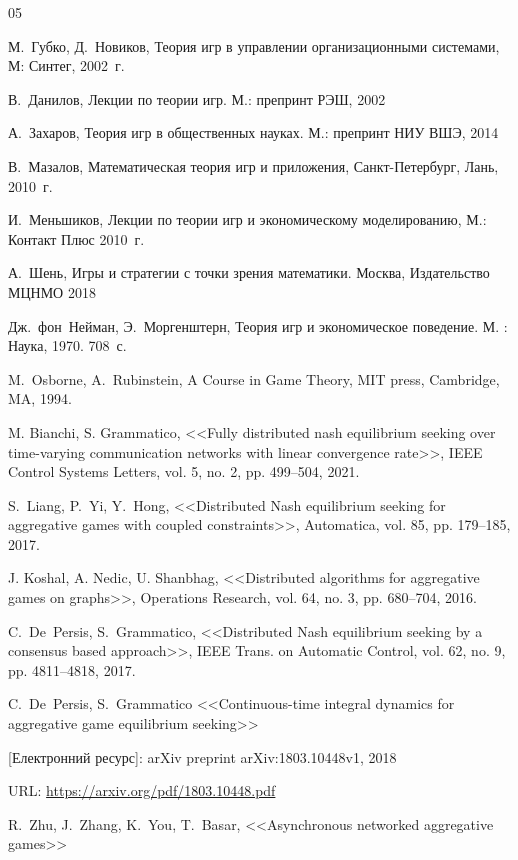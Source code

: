 \documentclass[a4paper]{article}
\begin{document}
\clearpage
\begin{thebibliography}{05}
{\small

 М.~Губко, Д.~Новиков, Теория игр в управлении организационными системами, М: Синтег, 2002~г.

 В.~Данилов, Лекции по теории игр. М.: препринт РЭШ, 2002

 А.~Захаров, Теория игр в общественных науках. М.: препринт НИУ ВШЭ, 2014

 В.~Мазалов, Математическая теория игр и приложения, Санкт-Петербург, Лань, 2010~г.

 И.~Меньшиков, Лекции по теории игр и экономическому моделированию, М.: Контакт Плюс 2010~г.

 А.~Шень, Игры и стратегии с точки зрения математики. Москва, Издательство МЦНМО 2018

 Дж.~фон~Нейман, Э.~Моргенштерн, Теория игр и экономическое поведение. М. : Наука, 1970. 708~с.

 M.~Osborne, A.~Rubinstein, A Course in Game Theory, MIT press, Cambridge, MA, 1994.

 M. Bianchi, S. Grammatico, <<Fully distributed nash equilibrium seeking over time-varying communication networks with linear convergence rate>>, IEEE Control Systems Letters, vol. 5, no. 2, pp. 499–504, 2021.

\label{Cite22} S.~Liang, P.~Yi, Y.~Hong, <<Distributed Nash equilibrium seeking for aggregative games with coupled constraints>>, Automatica, vol. 85, pp. 179–185, 2017.

 J. Koshal, A. Nedic, U. Shanbhag, <<Distributed algorithms for aggregative games on graphs>>, Operations Research, vol. 64, no. 3, pp. 680–704, 2016.

 C.~De~Persis, S.~Grammatico, <<Distributed Nash equilibrium seeking by a consensus based approach>>, IEEE Trans. on Automatic Control, vol. 62, no. 9, pp. 4811–4818, 2017.

 C.~De~Persis, S.~Grammatico <<Continuous-time integral dynamics for aggregative game equilibrium seeking>>

[Електронний ресурс]: arXiv preprint arXiv:1803.10448v1, 2018

URL: \url{https://arxiv.org/pdf/1803.10448.pdf}

 R.~Zhu, J.~Zhang, K.~You, T.~Basar, <<Asynchronous networked
aggregative games>>

}
\end{thebibliography}
\end{document}
